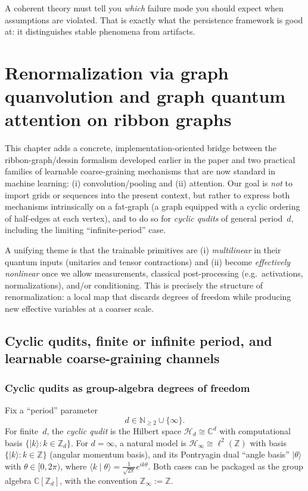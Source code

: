 \documentclass[11pt,oneside]{amsbook}
\numberwithin{equation}{section}
\theoremstyle{plain}
\theoremstyle{definition}
\theoremstyle{remark}
\newcommand{\ket}[1]{\lvert #1 \rangle}
\begin{document}
A coherent theory must tell you \emph{which} failure mode you should expect when assumptions are violated.
That is exactly what the persistence framework is good at: it distinguishes stable phenomena from artifacts.







\chapter{Renormalization via graph quanvolution and graph quantum attention on ribbon graphs}
\label{ch:renorm_graph}

This chapter adds a concrete, implementation-oriented bridge between the ribbon-graph/dessin
formalism developed earlier in the paper and two practical families of learnable coarse-graining
mechanisms that are now standard in machine learning: (i) convolution/pooling and (ii) attention.
Our goal is \emph{not} to import grids or sequences into the present context, but rather to express
both mechanisms intrinsically on a fat-graph (a graph equipped with a cyclic ordering of half-edges
at each vertex), and to do so for \emph{cyclic qudits} of general period~$d$, including the limiting
``infinite-period'' case.

A unifying theme is that the trainable primitives are (i) \emph{multilinear} in their quantum inputs
(unitaries and tensor contractions) and (ii) become \emph{effectively nonlinear} once we allow
measurements, classical post-processing (e.g.\ activations, normalizations), and/or conditioning.
This is precisely the structure of renormalization: a local map that discards degrees of freedom
while producing new effective variables at a coarser scale.

\section{Cyclic qudits, finite or infinite period, and learnable coarse-graining channels}
\label{sec:cyclic_qudits_channels}

\subsection{Cyclic qudits as group-algebra degrees of freedom}
Fix a ``period'' parameter
\[
  d \in \mathbb{N}_{\ge 2} \cup \{\infty\}.
\]
For finite~$d$, the \emph{cyclic qudit} is the Hilbert space $\mathcal{H}_d \cong \mathbb{C}^d$
with computational basis $\{\ket{k}: k\in \mathbb{Z}_d\}$.
For $d=\infty$, a natural model is $\mathcal{H}_\infty \cong \ell^2(\mathbb{Z})$
with basis $\{\ket{k}: k\in \mathbb{Z}\}$ (angular momentum basis), and its Pontryagin dual
``angle basis'' $\ket{\theta}$ with $\theta\in[0,2\pi)$, where $\langle k\mid \theta\rangle
= \frac{1}{\sqrt{2\pi}} e^{ik\theta}$.
Both cases can be packaged as the group algebra $\mathbb{C}[\mathbb{Z}_d]$, with the convention
$\mathbb{Z}_\infty:=\mathbb{Z}$.
\end{document}
